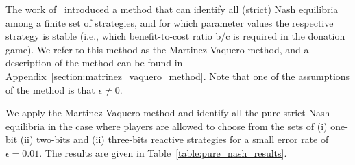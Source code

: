 \documentclass{article}
\theoremstyle{definition}
\begin{document}
The work of~\citep{hilbe:PNAS:2017} introduced a method that can identify all
(strict) Nash equilibria among a finite set of strategies, and for which
parameter values the respective strategy is stable (i.e., which benefit-to-cost
ratio b/c is required in the donation game). We refer to this method as the
Martinez-Vaquero method, and a description of the method can be found in
Appendix~\ref{section:matrinez_vaquero_method}. Note that one of the assumptions
of the method is that \(\epsilon \neq 0\).

We apply the Martinez-Vaquero method and identify all the pure strict Nash
equilibria in the case where players are allowed to choose from the sets of (i)
one-bit (ii) two-bits and (ii) three-bits reactive strategies for a small error
rate of \(\epsilon=0.01\). The results are given in
Table~\ref{table:pure_nash_results}.
\end{document}
